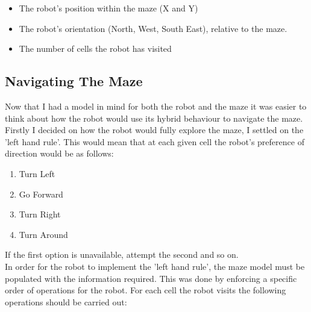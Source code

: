 \documentclass[a4paper]{article}
\begin{document}
	\begin{itemize}
		\item The robot's position within the maze (X and Y)
		\item The robot's orientation (North, West, South East), relative to the maze.
		\item The number of cells the robot has visited\\
	\end{itemize}
	
	
	\subsection{Navigating The Maze}
	Now that I had a model in mind for both the robot and the maze it was easier to think about how the robot would use its hybrid behaviour to navigate the maze. Firstly I decided on how the robot would fully explore the maze, I settled on the 'left hand rule'. This would mean that at each given cell the robot's preference of direction would be as follows:\\
	
	\begin{enumerate}
		\item Turn Left
		\item Go Forward
		\item Turn Right
		\item Turn Around\\
	\end{enumerate}
	
	If the first option is unavailable, attempt the second and so on.\\ 
	
	In order for the robot to implement the 'left hand rule', the maze model must be populated with the information required. This was done by enforcing a specific order of operations for the robot. For each cell the robot visits the following operations should be carried out:
	
	\newpage
	
\end{document}
